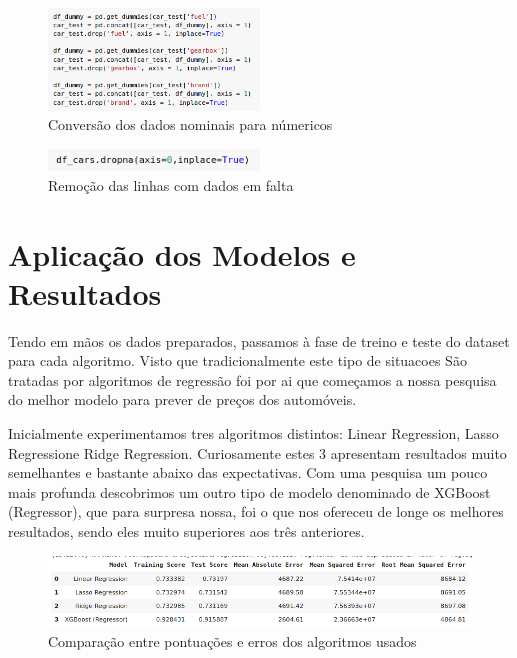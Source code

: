 \documentclass[a4paper]{report}
\begin{document}
\begin{figure}[H]
    \centering
    \includegraphics[width=0.5\textwidth]{images/remove_dummies.png}
    \caption{Conversão dos dados nominais para númericos}
\end{figure}

\begin{figure}[H]
    \centering
    \includegraphics[width=0.5\textwidth]{images/remove_missing.png}
    \caption{Remoção das linhas com dados em falta}
\end{figure}

\section{Aplicação dos Modelos e Resultados}

Tendo em mãos os dados preparados, passamos à fase de treino e teste do dataset para cada
algoritmo. Visto que tradicionalmente este tipo de situacoes São tratadas por algoritmos de
regressão foi por ai que começamos a nossa pesquisa do melhor modelo para prever de preços dos
automóveis.

Inicialmente experimentamos tres algoritmos distintos: Linear Regression, Lasso Regressione
Ridge Regression. Curiosamente estes 3 apresentam resultados muito semelhantes e bastante
abaixo das expectativas. Com uma pesquisa um pouco mais profunda descobrimos um outro tipo
de modelo denominado de XGBoost (Regressor), que para surpresa nossa, foi o que nos ofereceu
de longe os melhores resultados, sendo eles muito superiores aos três anteriores.

\begin{figure}[H]
    \centering
    \includegraphics[width=\textwidth]{images/resultados.png}
    \caption{Comparação entre pontuações e erros dos algoritmos usados}
\end{figure}
\end{document}

